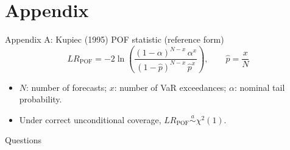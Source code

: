 \documentclass[10pt,aspectratio=169]{beamer}
\newcommand{\sm}{\small}
\begin{document}
\appendix
\section{Appendix}

\begin{frame}{Appendix A: Kupiec (1995) POF statistic (reference form)}
\sm
\begin{equation*}
LR_{\mathrm{POF}}=-2\ln\left(\frac{(1-\alpha)^{N-x}\,\alpha^{x}}{(1-\hat p)^{N-x}\,\hat p^{x}}\right),\qquad \hat p=\frac{x}{N}
\end{equation*}
\begin{itemize}
  \item \(N\): number of forecasts; \(x\): number of VaR exceedances; \(\alpha\): nominal tail probability.
  \item Under correct unconditional coverage, \(LR_{\mathrm{POF}}\overset{a}{\sim}\chi^2(1)\).
\end{itemize}
\end{frame}


\begin{frame}[standout]
Questions
\end{frame}
\end{document}
